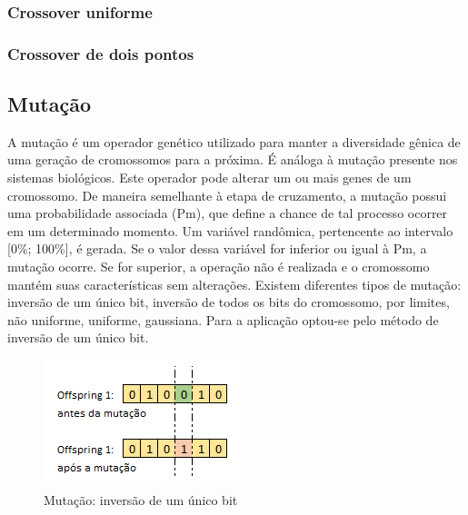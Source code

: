 \documentclass[twoside]{article}
\begin{document}
\begin{multicols}{2}
\subsubsection{Crossover uniforme}

\subsubsection{Crossover de dois pontos}

\subsection{Mutação}
A mutação é um operador genético utilizado para manter a diversidade gênica de uma geração de cromossomos para a próxima. É análoga à mutação presente nos sistemas biológicos. Este operador pode alterar um ou mais genes de um cromossomo. De maneira semelhante à etapa de cruzamento, a mutação possui uma probabilidade associada (Pm), que define a chance de tal processo ocorrer em um determinado momento. Um variável randômica, pertencente ao intervalo [0\%; 100\%], é gerada. Se o valor dessa variável for inferior ou igual à Pm, a mutação ocorre. Se for superior, a operação não é realizada e o cromossomo mantém suas características sem alterações.
Existem diferentes tipos de mutação: inversão de um único bit, inversão de todos os bits do cromossomo, por limites, não uniforme, uniforme, gaussiana. Para a aplicação optou-se pelo método de inversão de um único bit.

\begin{figure}[H]
\label{fig:mut}
  \caption{Mutação: inversão de um único bit}
  \centering
    \includegraphics[scale = 0.9]{mutation.png}
\end{figure}



\end{multicols}
\end{document}
